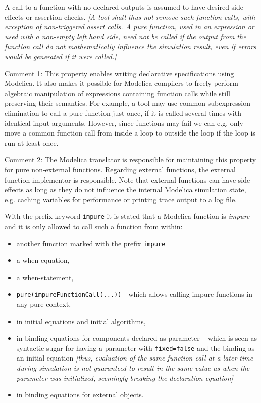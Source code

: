 A call to a function with no declared outputs is assumed to have desired
side-effects or assertion checks. \emph{{[}A tool shall thus not remove
such function calls, with exception of non-triggered assert calls. A
pure function, used in an expression or used with a non-empty left hand
side, need not be called if the output from the function call do not
mathematically influence the simulation result, even if errors would be
generated if it were called.{]}}

\begin{nonnormative}
Comment 1: This property enables writing declarative
specifications using Modelica. It also makes it possible for Modelica
compilers to freely perform algebraic manipulation of expressions
containing function calls while still preserving their semantics. For
example, a tool may use common subexpression elimination to call a pure
function just once, if it is called several times with identical input
arguments. However, since functions may fail we can e.g. only move a
common function call from inside a loop to outside the loop if the loop
is run at least once.
\end{nonnormative}

\begin{nonnormative}
Comment 2: The Modelica translator is responsible for
maintaining this property for pure non-external functions. Regarding
external functions, the external function implementor is responsible.
Note that external functions can have side-effects as long as they do
not influence the internal Modelica simulation state, e.g. caching
variables for performance or printing trace output to a log file.
\end{nonnormative}

With the prefix keyword \lstinline!impure! it is stated that a Modelica
function is \emph{impure} and it is only allowed to call such a function
from within:

\begin{itemize}
\item
  another function marked with the prefix \lstinline!impure!
\item
  a when-equation,
\item
  a when-statement,
\item
  \lstinline!pure(impureFunctionCall(...))! - which allows calling impure
  functions in any pure context,
\item
  in initial equations and initial algorithms,
\item
  in binding equations for components declared as parameter -- which is seen as
  syntactic sugar for having a parameter with \lstinline!fixed=false! and the
  binding as an initial equation \emph{{[}thus, evaluation of the same function
  call at a later time during simulation is not guaranteed to result in the same
  value as when the parameter was initialized, seemingly breaking the declaration
  equation{]}}
\item
  in binding equations for external objects.
\end{itemize}

